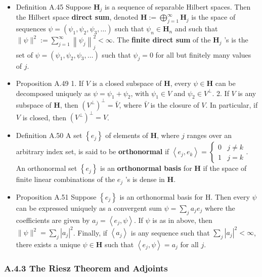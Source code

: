 \begin{itemize}
\item Definition A.45 Suppose $\mathbf{H}_{j}$ is a sequence of separable Hilbert spaces. Then the Hilbert space \textbf{direct sum}, denoted $\mathbf{H}:=\bigoplus_{j=1}^{\infty} \mathbf{H}_{j}$ is the space of sequences $\psi=\left(\psi_{1}, \psi_{2}, \psi_{3}, \ldots\right)$ such that $\psi_{n} \in \mathbf{H}_{n}$ and such that $\|\psi\|^{2}:=\sum_{j=1}^{\infty}\left\|\psi_{j}\right\|_{j}^{2}<\infty$. The \textbf{finite direct sum} of the $\mathbf{H}_{j}$ 's is the set of $\psi=\left(\psi_{1}, \psi_{2}, \psi_{3}, \ldots\right)$ such that $\psi_{j}=0$ for all but finitely many values of $j$.

\item Proposition A.49 1. If $V$ is a closed subspace of $\mathbf{H}$, every $\psi \in \mathbf{H}$ can be decomposed uniquely as $\psi=\psi_{1}+\psi_{2}$, with $\psi_{1} \in V$ and $\psi_{2} \in V^{\perp}$. 2. If $V$ is any subspace of $\mathbf{H}$, then $\left(V^{\perp}\right)^{\perp}=\bar{V}$, where $\bar{V}$ is the closure of $V$. In particular, if $V$ is closed, then $\left(V^{\perp}\right)^{\perp}=V$.

\item Definition A.50 A set $\left\{e_{j}\right\}$ of elements of $\mathbf{H}$, where $j$ ranges over an arbitrary index set, is said to be \textbf{orthonormal} if $\left\langle e_{j}, e_{k}\right\rangle=\left\{\begin{array}{cc}
0 & j \neq k \\
1 & j=k
\end{array} .\right.$ An orthonormal set $\left\{e_{j}\right\}$ is an \textbf{orthonormal basis} for $\mathbf{H}$ if the space of finite linear combinations of the $e_{j}$ 's is dense in $\mathbf{H}$.

\item Proposition A.51 Suppose $\left\{e_{j}\right\}$ is an orthonormal basis for H. Then every $\psi$ can be expressed uniquely as a convergent sum $\psi=\sum_{j} a_{j} e_{j}$ where the coefficients are given by $a_{j}=\left\langle e_{j}, \psi\right\rangle$. If $\psi$ is as in above, then $\|\psi\|^{2}=\sum_{j}\left|a_{j}\right|^{2}$. Finally, if $\left\langle a_{j}\right\rangle$ is any sequence such that $\sum_{j}\left|a_{j}\right|^{2}<\infty$, there exists a unique $\psi \in \mathbf{H}$ such that $\left\langle e_{j}, \psi\right\rangle=a_{j}$ for all $j$.
\end{itemize}

\subsubsection{A.4.3 The Riesz Theorem and Adjoints}

